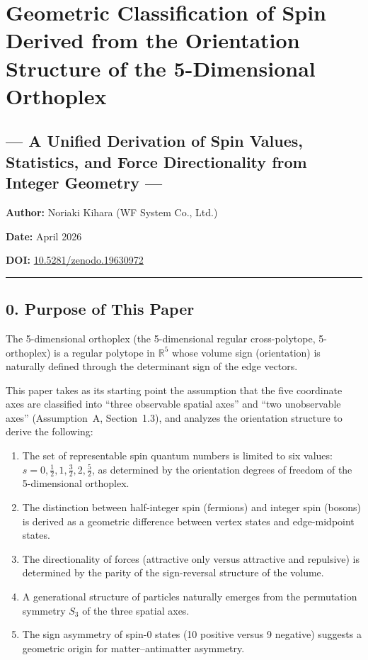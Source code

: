 \documentclass[a4paper,11pt]{article}
\providecommand{\tightlist}{\setlength{\itemsep}{0pt}\setlength{\parskip}{0pt}}
\begin{document}
\section*{Geometric Classification of Spin Derived from the Orientation Structure of the 5-Dimensional Orthoplex}

\subsection*{--- A Unified Derivation of Spin Values, Statistics, and Force Directionality from Integer Geometry ---}

\textbf{Author:} Noriaki Kihara (WF System Co., Ltd.)

\textbf{Date:} April 2026

\textbf{DOI:}
\href{https://doi.org/10.5281/zenodo.19630972}{10.5281/zenodo.19630972}

\begin{center}\rule{0.5\linewidth}{0.5pt}\end{center}

\subsection*{0. Purpose of This Paper}

The 5-dimensional orthoplex (the 5-dimensional regular cross-polytope, 5-orthoplex) is a regular polytope in $\mathbb{R}^5$ whose volume sign (orientation) is naturally defined through the determinant sign of the edge vectors.

This paper takes as its starting point the assumption that the five coordinate axes are classified into ``three observable spatial axes'' and ``two unobservable axes'' (Assumption~A, Section~1.3), and analyzes the orientation structure to derive the following:

\begin{enumerate}
\def\labelenumi{\arabic{enumi}.}
\tightlist
\item
  The set of representable spin quantum numbers is limited to six values:
  $s = 0, \frac{1}{2}, 1, \frac{3}{2}, 2, \frac{5}{2}$, as determined by the orientation degrees of freedom of the 5-dimensional orthoplex.
\item
  The distinction between half-integer spin (fermions) and integer spin (bosons) is derived as a geometric difference between vertex states and edge-midpoint states.
\item
  The directionality of forces (attractive only versus attractive and repulsive) is determined by the parity of the sign-reversal structure of the volume.
\item
  A generational structure of particles naturally emerges from the permutation symmetry $S_3$ of the three spatial axes.
\item
  The sign asymmetry of spin-0 states (10 positive versus 9 negative) suggests a geometric origin for matter--antimatter asymmetry.
\end{enumerate}
\end{document}
